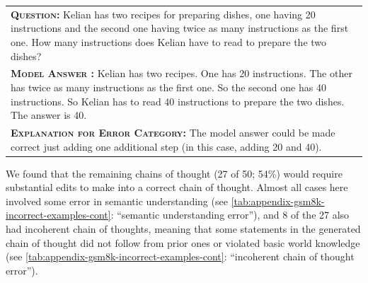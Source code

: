 \documentclass[]{article}
\newcommand{\xmark}{\ding{55}}%
\theoremstyle{plain}
\theoremstyle{definition}
\theoremstyle{remark}
\begin{document}
\begin{table}[h]
\begin{tabular}{p{\linewidth}}
        \midrule
        \vspace{-2mm}
        \textbf{\textsc{Question:}} Kelian has two recipes for preparing dishes, one having 20 instructions and the second one having twice as many instructions as the first one. How many instructions does Kelian have to read to prepare the two dishes? \\
        \vspace{-1mm}
        \textbf{\textsc{Model Answer \color{blue}{(incorrect; one step missing error)}:}} Kelian has two recipes. One has 20 instructions. The other has twice as many instructions as the first one. So the second one has 40 instructions. So Kelian has to read 40 instructions to prepare the two dishes. The answer is 40.   \color{blue}{\xmark} \\
        \vspace{-1mm}
        \textbf{\textsc{Explanation for Error Category:}} The model answer could be made correct just adding one additional step (in this case, adding 20 and 40). \\
        \bottomrule
    \end{tabular}
    \label{tab:appendix-gsm8k-incorrect-examples}
\end{table}
\endgroup

We found that the remaining chains of thought (27 of 50; 54\%) would require substantial edits to make into a correct chain of thought.
Almost all cases here involved some error in semantic understanding (see \cref{tab:appendix-gsm8k-incorrect-examples-cont}: ``semantic understanding error''), and 8 of the 27 also had incoherent chain of thoughts, meaning that some statements in the generated chain of thought did not follow from prior ones or violated basic world knowledge (see \cref{tab:appendix-gsm8k-incorrect-examples-cont}: ``incoherent chain of thought error'').
\end{document}
